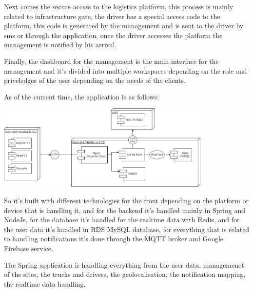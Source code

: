 Next comes the secure access to the logistics platform, this process is mainly related to infrastructure gate,
the driver has a special access code to the platform, this code is generated by the management and is sent to
the driver by sms or through the application, once the driver accesses the platform the management is notified
by his arrival.

Finally, the dashboard for the management is the main interface for the management and it's divided into multiple
workspaces depending on the role and priveledges of the user depending on the needs of the clients.

As of the current time, the application is as follows:

\begin{center}
    \includegraphics[width=0.8\textwidth]{images/State-of-art}
\end{center}

So it's built with different technologies for the front depending on the platform or device
that is handling it, and for the backend it's handled mainly in Spring and NodeJs, for
the database it's handled for the realtime data with Redis, and for the user data it's 
handled in RDS MySQL database, for everything that is related to handling notifications
it's done through the MQTT broker and Google Firebase service.

The Spring application is handling everything from the user data, managemenet of the sites,
the trucks and drivers, the geolocalisation, the notification mapping, the realtime data
handling.

